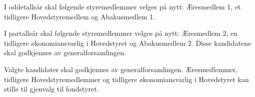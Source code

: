 I oddetallsår skal følgende styremedlemmer velges på nytt: Æresmedlem 1, et tidligere
Hovedstyremedlem og Abakusmedlem 1.

I partallsår skal følgende styremedlemmer velges på nytt: Æresmedlem 2, en tidligere
økonomiansvarlig i Hovedstyret og Abakusmedlem 2.
Disse kandidatene skal godkjennes av generalforsamlingen.

Valgte kandidater skal godkjennes av generalforsamlingen. Æresmedlemmer,
tidligere Hovedstyremedlemmer og tidligere økonomiansvarlig i Hovedstyret kan
stille til gjenvalg til fondstyret.
